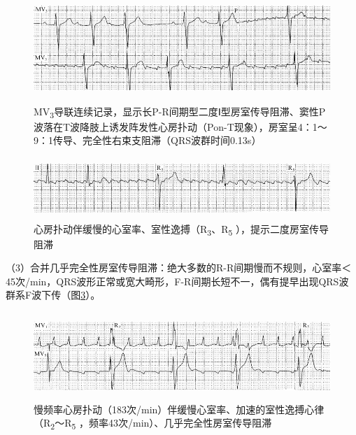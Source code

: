 \begin{figure}[!htbp]
 \centering
 \includegraphics[width=5.58333in,height=1.59375in]{./images/Image00216.jpg}
 \captionsetup{justification=centering}
 \caption{MV\textsubscript{3}导联连续记录，显示长P-R间期型二度Ⅰ型房室传导阻滞、窦性P波落在T波降肢上诱发阵发性心房扑动（Pon-T现象），房室呈4：1～9：1传导、完全性右束支阻滞（QRS波群时间0.13s）}
 \label{fig13-8}
  \end{figure} 


\begin{figure}[!htbp]
 \centering
 \includegraphics[width=5.58333in,height=0.91667in]{./images/Image00217.jpg}
 \captionsetup{justification=centering}
 \caption{心房扑动伴缓慢的心室率、室性逸搏（R\textsubscript{3}、R\textsubscript{5} ），提示二度房室传导阻滞}
 \label{fig13-9}
  \end{figure} 


（3）合并几乎完全性房室传导阻滞：绝大多数的R-R间期慢而不规则，心室率＜45次/min，QRS波形正常或宽大畸形，F-R间期长短不一，偶有提早出现QRS波群系F波下传（图\ref{fig13-10}）。

\begin{figure}[!htbp]
 \centering
 \includegraphics[width=5.58333in,height=1.30208in]{./images/Image00218.jpg}
 \captionsetup{justification=centering}
 \caption{慢频率心房扑动（183次/min）伴缓慢心室率、加速的室性逸搏心律（R\textsubscript{2}～R\textsubscript{5} ，频率43次/min）、几乎完全性房室传导阻滞}
 \label{fig13-10}
  \end{figure} 


